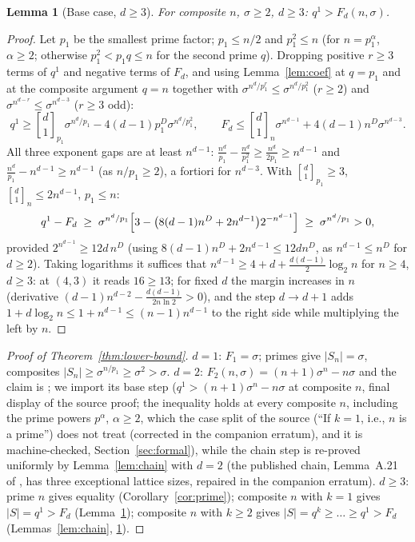 \documentclass[11pt,a4paper]{article}
\newtheorem{lemma}[theorem]{Lemma}
\theoremstyle{remark}
\newcommand{\gaussbinom}[2]{\genfrac{[}{]}{0pt}{}{#1}{#2}}
\begin{document}
\begin{lemma}[Base case, $d\ge3$]\label{lem:base}
For composite $n$, $\sigma\ge2$, $d\ge3$: $q^1>F_d(n,\sigma)$.
\end{lemma}

\begin{proof}
Let $p_1$ be the smallest prime factor; $p_1\le n/2$ and $p_1^2\le n$
(for $n=p_1^{\alpha}$, $\alpha\ge2$; otherwise $p_1^2<p_1q\le n$ for the
second prime $q$). Dropping positive $r\ge3$ terms of $q^1$ and negative
terms of $F_d$, and using Lemma~\ref{lem:coef} at $q=p_1$ and at the
composite argument $q=n$ together with
$\sigma^{n^d/p_1^r}\le\sigma^{n^d/p_1^2}$ ($r\ge2$) and
$\sigma^{n^{d-r}}\le\sigma^{n^{d-3}}$ ($r\ge3$ odd):
\[
  q^1\ge\gaussbinom d1_{p_1}\sigma^{n^d/p_1}
  -4(d-1)p_1^{D}\sigma^{n^d/p_1^2},
  \qquad
  F_d\le\gaussbinom d1_n\sigma^{n^{d-1}}
  +4(d-1)n^{D}\sigma^{n^{d-3}} .
\]
All three exponent gaps are at least $n^{d-1}$:
$\tfrac{n^d}{p_1}-\tfrac{n^d}{p_1^2}\ge\tfrac{n^d}{2p_1}\ge n^{d-1}$ and
$\tfrac{n^d}{p_1}-n^{d-1}\ge n^{d-1}$ (as $n/p_1\ge2$), a fortiori for
$n^{d-3}$. With $\gaussbinom d1_{p_1}\ge3$, $\gaussbinom d1_n\le
2n^{d-1}$, $p_1\le n$:
\[
  q^1-F_d\;\ge\;\sigma^{n^d/p_1}\Bigl[3-\bigl(8(d-1)n^{D}
  +2n^{d-1}\bigr)2^{-n^{d-1}}\Bigr]\;\ge\;\sigma^{n^d/p_1}>0,
\]
provided $2^{n^{d-1}}\ge12d\,n^{D}$ (using
$8(d-1)n^D+2n^{d-1}\le12dn^D$, as $n^{d-1}\le n^D$ for $d\ge2$). Taking
logarithms it suffices that $n^{d-1}\ge4+d+\tfrac{d(d-1)}2\log_2n$ for
$n\ge4$, $d\ge3$: at $(4,3)$ it reads $16\ge13$; for fixed $d$ the margin
increases in $n$ (derivative $(d-1)n^{d-2}-\tfrac{d(d-1)}{2n\ln2}>0$),
and the step $d\to d{+}1$ adds $1+d\log_2n\le1+n^{d-1}\le(n-1)n^{d-1}$
to the right side while multiplying the left by $n$.
\end{proof}

\begin{proof}[Proof of Theorem~\ref{thm:lower-bound}]
$d=1$: $F_1=\sigma$; primes give $|S_n|=\sigma$, composites
$|S_n|\ge\sigma^{n/p_1}\ge\sigma^2>\sigma$.
$d=2$: $F_2(n,\sigma)=(n{+}1)\sigma^n-n\sigma$ and the claim is
\cite[Lemma~E.21]{banda2019}; we import its base step
($q^1>(n{+}1)\sigma^n-n\sigma$ at composite $n$, final display of the
source proof; the inequality holds at every composite $n$, including the
prime powers $p^\alpha$, $\alpha\ge2$, which the case split of the source
(``If $k=1$, i.e., $n$ is a prime'') does not treat (corrected in the companion erratum), and it is
machine-checked, Section~\ref{sec:formal}), while the chain step is re-proved uniformly by
Lemma~\ref{lem:chain} with $d=2$ (the published chain, Lemma~A.21 of
\cite{banda2019}, has three exceptional lattice sizes, repaired in the
companion erratum).
$d\ge3$: prime $n$ gives equality (Corollary~\ref{cor:prime}); composite
$n$ with $k=1$ gives $|S|=q^1>F_d$ (Lemma~\ref{lem:base}); composite $n$
with $k\ge2$ gives $|S|=q^k\ge\dots\ge q^1>F_d$
(Lemmas~\ref{lem:chain}, \ref{lem:base}).
\end{proof}
\end{document}

